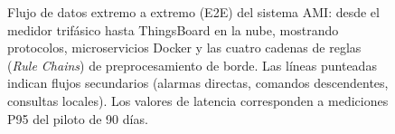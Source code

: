\begin{figure}[htbp]
{
}%
\caption[Flujo de datos extremo a extremo del sistema AMI]{Flujo de datos extremo a extremo (E2E) del sistema AMI: desde el medidor trifásico hasta ThingsBoard en la nube, mostrando protocolos, microservicios Docker y las cuatro cadenas de reglas (\textit{Rule Chains}) de preprocesamiento de borde. Las líneas punteadas indican flujos secundarios (alarmas directas, comandos descendentes, consultas locales). Los valores de latencia corresponden a mediciones P95 del piloto de 90 días.}
\label{fig:data-flow-e2e}
\end{figure}

